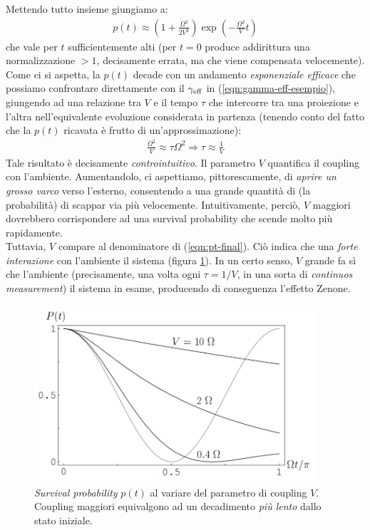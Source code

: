 \documentclass[../../InformazioneQuantistica.tex]{subfiles}
\begin{document}
Mettendo tutto insieme giungiamo a:
\begin{align}
p(t) \approx \left(1+\frac{\Omega^2}{2V^2}\right)\exp\left(-\frac{\Omega^2}{V}t\right)
\label{eqn:pt-final}
\end{align}
che vale per $t$ sufficientemente alti (per $t=0$ produce addirittura una normalizzazione $>1$, decisamente errata, ma che viene compensata velocemente).\\
Come ci si aspetta, la $p(t)$ decade con un andamento \textit{esponenziale efficace} che possiamo confrontare direttamente con il $\gamma_{\operatorname{eff}}$ in (\ref{eqn:gamma-eff-esempio}), giungendo ad una relazione tra $V$ e il tempo $\tau$ che intercorre tra una proiezione e l'altra nell'equivalente evoluzione considerata in partenza (tenendo conto del fatto che la $p(t)$ ricavata è frutto di un'approssimazione):
\begin{align}
\frac{\Omega^2}{V}\approx\tau\Omega^2 \Rightarrow \tau\approx\frac{1}{V}
\label{eqn:tau-V}
\end{align}
Tale risultato è decisamente \textit{controintuitivo}. Il parametro $V$ quantifica il coupling con l'ambiente. Aumentandolo, ci aspettiamo, pittorescamente, di \textit{aprire un grosso varco} verso l'esterno, consentendo a una grande quantità di  (la probabilità) di scappar via più velocemente. Intuitivamente, perciò, $V$ maggiori dovrebbero corrispondere ad una survival probability che scende molto più rapidamente.\\
Tuttavia, $V$ compare al denominatore di (\ref{eqn:pt-final}). Ciò indica che una \textit{forte interazione} con l'ambiente  il sistema (figura \ref{fig:V-pt}). In un certo senso, $V$ grande fa sì che l'ambiente  (precisamente, una volta ogni $\tau=1/V$, in una sorta di \textit{continuos measurement}) il sistema in esame, producendo di conseguenza l'effetto Zenone.

\begin{figure}[H]
\centering
\includegraphics[width=10.5cm]{Immagini/7_3/image004.png}
\caption{\textit{Survival probability} $p(t)$ al variare del parametro di coupling $V$. Coupling maggiori equivalgono ad un decadimento \textit{più lento} dallo stato iniziale.\label{fig:V-pt}}
\end{figure}
\end{document}
